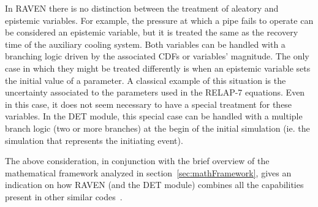 In RAVEN there is no distinction between the treatment of aleatory and epistemic variables. For example, the pressure at which a pipe fails to operate can be considered an epistemic variable, but it is treated the same as the recovery time of the auxiliary cooling system. Both variables can be handled with a branching logic driven by the associated CDFs or variables’ magnitude. The only case in which they might be treated differently is when an epistemic variable sets the initial value of a parameter. A classical example of this situation is the uncertainty associated to the parameters used in the RELAP-7 equations. Even in this case, it does not seem necessary to have a special treatment for these variables. In the DET module, this special case can be handled  with a multiple branch logic (two or more branches) at the begin of the initial simulation (ie. the simulation that represents the initiating event).

The above consideration, in conjunction with the brief overview of the mathematical framework analyzed in section~\ref{sec:mathFramework}, gives an indication on how RAVEN (and the DET module) combines all the capabilities present in other similar codes~\cite{ADAPTHakobyan}.  

